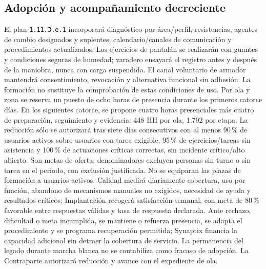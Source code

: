 \subsection{Adopción y acompañamiento decreciente}
El plan \texttt{1.11.3.e.1} incorporará diagnóstico por área/perfil, resistencias, agentes de cambio designados y suplentes, calendario/canales de comunicación y procedimientos actualizados. Los ejercicios de pantalán se realizarán con guantes y condiciones seguras de humedad; varadero ensayará el registro antes y después de la maniobra, nunca con carga suspendida. El canal voluntario de armador mantendrá consentimiento, revocación y alternativa funcional sin adhesión. La formación no sustituye la comprobación de estas condiciones de uso.
Por ola y zona se reserva un puesto de ocho horas de presencia durante los primeros catorce días. En los siguientes catorce, se propone cuatro horas presenciales más cuatro de preparación, seguimiento y evidencia: 448 HH por ola, 1.792 por etapa. La reducción sólo se autorizará tras siete días consecutivos con al menos 90\,\% de usuarios activos sobre usuarios con tarea exigible, 95\,\% de ejercicios/tareas sin asistencia y 100\,\% de actuaciones críticas correctas, sin incidente crítico/alto abierto. Son metas de oferta; denominadores excluyen personas sin turno o sin tarea en el período, con exclusión justificada. No se equiparan las plazas de formación a usuarios activos.
Calidad medirá diariamente cobertura, uso por función, abandono de mecanismos manuales no exigidos, necesidad de ayuda y resultados críticos; Implantación recogerá satisfacción semanal, con meta de 80\,\% favorable entre respuestas válidas y tasa de respuesta declarada. Ante rechazo, dificultad o meta incumplida, se mantiene o refuerza presencia, se adapta el procedimiento y se programa recuperación permitida; Synaptix financia la capacidad adicional sin detraer la cobertura de servicio. La permanencia del legado durante marcha blanca no se contabiliza como fracaso de adopción. La Contraparte autorizará reducción y avance con el expediente de ola.~\parencite[art.~89; p.~45]{bases-admin}~\parencite[RT-20.01/05; p.~35]{bases-transversales}


